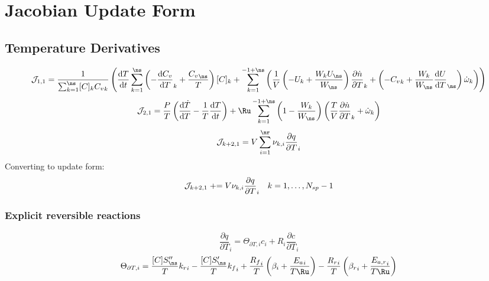 \documentclass[a4paper,10pt]{article}
\newcommand{\pluseq}{\mathrel{{+}{=}}}
\begin{document}
\section{Jacobian Update Form}
\subsection{Temperature Derivatives}
\begin{dmath} \mathcal{J}_{1,1} = \frac{1}{\sum_{k=1}^{\ns} [C]_{k} {C_v}_{k}} \left(\frac{\text{d} T }{\text{d} t } \sum_{k=1}^{\ns} \left(- \frac{\text{d} {C_v} }{\text{d} T }_{k} + \frac{{C_v}_{\ns}}{T}\right) [C]_{k} + \sum_{k=1}^{-1 + \ns} \left(\frac{1}{V} \left(- U_{k} + \frac{W_{k} U_{\ns}}{W_{\ns}}\right) \frac{\partial \dot{n} }{\partial T }_{k} + \left(- {C_v}_{k} + \frac{W_{k}}{W_{\ns}} \frac{\text{d} U }{\text{d} T }_{\ns}\right) \dot{\omega}_{k}\right)\right)\end{dmath} 
\begin{dmath} \mathcal{J}_{2,1} = \frac{P}{T} \left(\frac{\text{d} \dot{T} }{\text{d} T } - \frac{1}{T} \frac{\text{d} T }{\text{d} t }\right) + \Ru \sum_{k=1}^{-1 + \ns} \left(1 - \frac{W_{k}}{W_{\ns}}\right) \left(\frac{T}{V} \frac{\partial \dot{n} }{\partial T }_{k} + \dot{\omega}_{k}\right)\end{dmath} 
\begin{dmath} \mathcal{J}_{k + 2,1} = V \sum_{i=1}^{\nr} \nu_{k,i} \frac{\partial q }{\partial T }_{i}\end{dmath} 
Converting to update form:
\begin{dmath} \mathcal{J}_{k + 2,1}\pluseq V \nu_{k,i} \frac{\partial q }{\partial T }_{i}\text{\quad} k = 1, \ldots, N_{sp} - 1\end{dmath} 
\subsubsection{Explicit reversible reactions}
\begin{dmath} \frac{\partial q }{\partial T }_{i} = \Theta_{\partial T, i} c_{i} + R_{i} \frac{\partial c }{\partial T }_{i}\end{dmath} 
\begin{dmath} \Theta_{\partial T, i} = \frac{[C] S^{\prime\prime}_{\ns}}{T} {k_r}_{i} - \frac{[C] S^{\prime}_{\ns}}{T} {k_f}_{i} + \frac{{R_f}_{i}}{T} \left(\beta_{i} + \frac{{E_{a}}_{i}}{T \Ru}\right) - \frac{{R_r}_{i}}{T} \left({\beta_r}_{i} + \frac{{E_{a,r}}_{i}}{T \Ru}\right)\end{dmath} 
\end{document}
